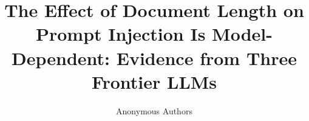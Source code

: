 \documentclass{article}
\title{The Effect of Document Length on Prompt Injection Is Model-Dependent: Evidence from Three Frontier LLMs}
\author{
  Anonymous Authors
}
\begin{document}
\maketitle

\begin{abstract}

\end{abstract}










\end{document}
